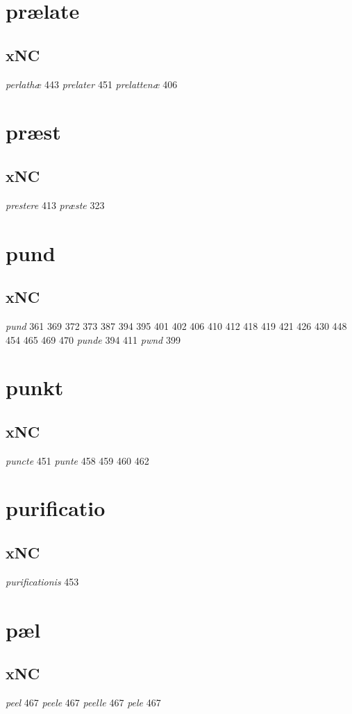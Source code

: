 \documentclass[a4paper,twocolumn]{article}
\begin{document}
\section{prælate}
\label{sec:org7d18700}
\subsection{xNC}
\label{sec:orge0799a8}
\emph{perlathæ} 443 \emph{prelater} 451 \emph{prelattenæ} 406 
\section{præst}
\label{sec:org7fc44af}
\subsection{xNC}
\label{sec:org9c19361}
\emph{prestere} 413 \emph{præste} 323 
\section{pund}
\label{sec:org7168e64}
\subsection{xNC}
\label{sec:orgca51a4d}
\emph{pund} 361 369 372 373 387 394 395 401 402 406 410 412 418 419 421 426 430 448 454 465 469 470 \emph{punde} 394 411 \emph{pwnd} 399 
\section{punkt}
\label{sec:orgf88ed15}
\subsection{xNC}
\label{sec:orga0248d5}
\emph{puncte} 451 \emph{punte} 458 459 460 462 
\section{purificatio}
\label{sec:orgd5cca47}
\subsection{xNC}
\label{sec:org917a802}
\emph{purificationis} 453 
\section{pæl}
\label{sec:org0b7bf70}
\subsection{xNC}
\label{sec:orgc2c632b}
\emph{peel} 467 \emph{peele} 467 \emph{peelle} 467 \emph{pele} 467 
\end{document}
